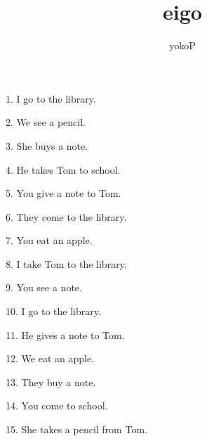 \documentclass[uplatex,
paper=a4,
fontsize=18pt,
jafontsize=16pt,
number_of_lines=30,
line_length=30zh,
baselineskip=25pt,
]{jlreq}
\author{yokoP}
\title{eigo}
\begin{document}
1.  I go to the library.

2.  We see a pencil.

3.  She buys a note.

4.  He takes Tom to school.

5.  You give a note to Tom.

6.  They come to the library.

7.  You eat an apple.

8.  I take Tom to the library.

9.  You see a note.

10.  I go to the library.

11.  He gives a note to Tom.

12.  We eat an apple.

13.  They buy a note.

14.  You come to school.

15.  She takes a pencil from Tom.
\end{document}
